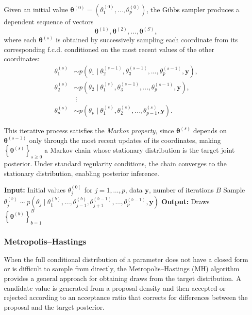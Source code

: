 Given an initial value $\bm{\theta}^{(0)} = \left( \theta_1^{(0)}, \ldots, \theta_p^{(0)} \right)$, the Gibbs sampler produces a dependent sequence of vectors
$$
\bm{\theta}^{(1)}, \bm{\theta}^{(2)}, \ldots, \bm{\theta}^{(S)},
$$
where each $\bm{\theta}^{(s)}$ is obtained by successively sampling each coordinate from its corresponding f.c.d. conditioned on the most recent values of the other coordinates:
\begin{align*}
\theta_1^{(s)} &\sim p\left(\theta_1 \mid \theta_2^{(s-1)}, \theta_3^{(s-1)}, \ldots, \theta_p^{(s-1)}, \bm{y}\right), \\
\theta_2^{(s)} &\sim p\left(\theta_2 \mid \theta_1^{(s)}, \theta_3^{(s-1)}, \ldots, \theta_p^{(s-1)}, \bm{y}\right), \\
&\ \vdots \\
\theta_p^{(s)} &\sim p\left(\theta_p \mid \theta_1^{(s)}, \theta_2^{(s)}, \ldots, \theta_{p-1}^{(s)}, \bm{y}\right).
\end{align*}

This iterative process satisfies the \textit{Markov property}, since $\bm{\theta}^{(s)}$ depends on $\bm{\theta}^{(s-1)}$ only through the most recent updates of its coordinates, making $\left\{\bm{\theta}^{(s)}\right\}_{s \ge 0}$ a Markov chain whose stationary distribution is the target joint posterior. Under standard regularity conditions, the chain converges to the stationary distribution, enabling posterior inference.

\begin{algorithm}[H]
\caption{Gibbs Sampling}
\begin{algorithmic}
\State \textbf{Input:} Initial values $\theta_j^{(0)}$ for $j = 1,\dots,p$, data $\bm{y}$, number of iterations $B$
    \State Sample $\theta_j^{(b)} \sim p\left(\theta_j \mid \theta_1^{(b)}, \ldots, \theta_{j-1}^{(b)}, \theta_{j+1}^{(b-1)}, \ldots, \theta_p^{(b-1)}, \bm{y}\right)$
  \EndFor
\EndFor
\State \textbf{Output:} Draws $\left\{\bm{\theta}^{(b)}\right\}_{b=1}^B$
\end{algorithmic}
\end{algorithm}



\subsubsection{Metropolis–Hastings}

When the full conditional distribution of a parameter does not have a closed form or is difficult to sample from directly, the Metropolis–Hastings (MH) algorithm provides a general approach for obtaining draws from the target distribution. A candidate value is generated from a proposal density and then accepted or rejected according to an acceptance ratio that corrects for differences between the proposal and the target posterior.

